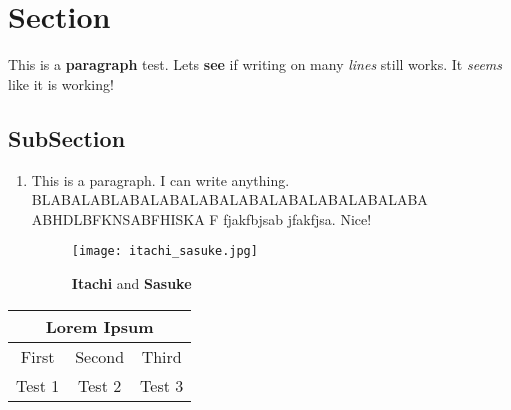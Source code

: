 \documentclass[12pt]{article}
\begin{document}
	\section*{Section}

		This is a \textbf{paragraph} test. Lets \textbf{see} if writing on many \textit{lines} still works. It \textit{seems} like it is working!

		\subsection{SubSection}

			\begin{enumerate}

				\item
				This is a paragraph. I can write anything. BLABALABLABALABALABALABALABALABALABALABA ABHDLBFKNSABFHISKA F fjakfbjsab jfakfjsa. Nice!

				\begin{figure}[H]
					\centering
					\texttt{[image: itachi\_sasuke.jpg]}
					\caption{\textbf{Itachi} and \textbf{Sasuke}}
				\end{figure}

			\end{enumerate}

		\begin{center}
		\begin{tabular}{|c|c|c|}
			\hline
			\multicolumn{3}{|c|}{\textbf{Lorem Ipsum}} \\
			\hline
			First & Second & Third \\
			\hline
			Test 1 & Test 2 & Test 3 \\
			\hline
		\end{tabular}
		\end{center}
\end{document}
